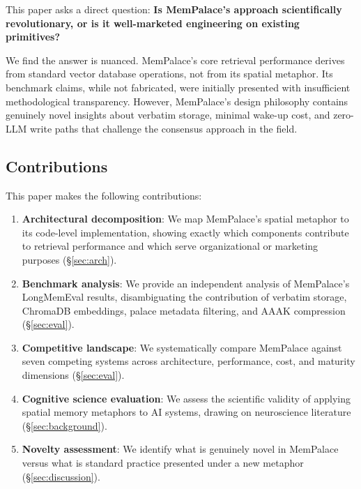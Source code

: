 \documentclass[twoside,11pt]{article}
\begin{document}
This paper asks a direct question: \textbf{Is MemPalace's approach
scientifically revolutionary, or is it well-marketed engineering on existing
primitives?}

We find the answer is nuanced.  MemPalace's core retrieval performance derives
from standard vector database operations, not from its spatial metaphor.  Its
benchmark claims, while not fabricated, were initially presented with
insufficient methodological transparency.  However, MemPalace's design
philosophy contains genuinely novel insights about verbatim storage, minimal
wake-up cost, and zero-LLM write paths that challenge the consensus approach
in the field.

\subsection{Contributions}

This paper makes the following contributions:

\begin{enumerate}[leftmargin=*, label=\arabic*.]
\item \textbf{Architectural decomposition}: We map MemPalace's spatial
  metaphor to its code-level implementation, showing exactly which components
  contribute to retrieval performance and which serve organizational or
  marketing purposes (\S\ref{sec:arch}).

\item \textbf{Benchmark analysis}: We provide an independent analysis of
  MemPalace's LongMemEval results, disambiguating the contribution of verbatim
  storage, ChromaDB embeddings, palace metadata filtering, and AAAK
  compression (\S\ref{sec:eval}).

\item \textbf{Competitive landscape}: We systematically compare MemPalace
  against seven competing systems across architecture, performance, cost, and
  maturity dimensions (\S\ref{sec:eval}).

\item \textbf{Cognitive science evaluation}: We assess the scientific validity
  of applying spatial memory metaphors to AI systems, drawing on neuroscience
  literature (\S\ref{sec:background}).

\item \textbf{Novelty assessment}: We identify what is genuinely novel in
  MemPalace versus what is standard practice presented under a new metaphor
  (\S\ref{sec:discussion}).
\end{enumerate}
\end{document}
